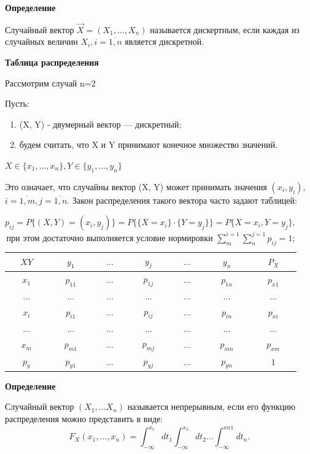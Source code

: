 \textbf{Определение}

Случайный вектор $\overrightarrow{X} = (X_1, \dots, X_n)$ называется дискертным, если каждая из случайных величин $X_i, i=\overline{1,n}$ является дискретной.


\textbf{Таблица распределения}

Рассмотрим случай n=2

Пусть: 
\begin{enumerate}[label=\arabic*.]
	\item (X, Y) - двумерный вектор --- дискретный;
	\item будем считать, что X и Y принимают конечное множество значений.  
\end{enumerate}
$X \in \{x_1, \dots, x_n\}, Y \in \{y_1, \dots, y_n\}$

Это означает, что случайны вектор (X, Y) может принимать значения $(x_i, y_i)$, $i=\overline{1,m}, j=\overline{1,n}$. Закон распределения такого вектора часто задают таблицей:
 
\begin{table}[ht!]
	\begin{center}
		\caption{$p_{ij} = P\{(X, Y)=(x_i, y_j)\} = P\{\{X=x_i\} \cdot \{Y=y_j\}\} = P\{X=x_i, Y=y_j\}, $ при этом достаточно выполняется условие нормировки $\sum_{m}^{i=1}\sum_{n}^{j=1}p_{ij}=1$;}
		\label{tbl:best}
		\begin{tabular}{|c|c|c|c|c|c|c|}
			\hline
			$XY$ & $y_1$ & $\dots$ & $y_j$ & $\dots$ &  $y_n$ & $P_X$\\  \hline
			$x_1$ & $p_{11}$ & $\dots$ & $p_{1j}$ & $\dots$ &  $p_{1n}$ & $p_{x1}$\\  \hline
			$\dots$ & $\dots$ & $\dots$ & $\dots$ & $\dots$ &  $\dots$ & $\dots$\\  \hline
			$x_i$ & $p_{i1}$ & $\dots$ & $p_{ij}$ & $\dots$ &  $p_{in}$ & $p_{xi}$\\  \hline
			$\dots$ & $\dots$ & $\dots$ & $\dots$ & $\dots$ &  $\dots$ & $\dots$\\ \hline
			$x_m$ & $p_{m1}$ & $\dots$ & $p_{mj}$ & $\dots$ &  $p_{mn}$ & $p_{xm}$\\  \hline
			$p_y$ & $p_{y1}$ & $\dots$ & $p_{yj}$ & $\dots$ &  $p_{yn}$ & $1$\\  
			\hline
		\end{tabular}
	\end{center}
\end{table}

\textbf{Определение}

Случайный вектор $(X_1, \dots X_n)$ называется непрерывным, если его функцию распределения можно представить в виде: 
\begin{equation}
	F_X(x_1, \dots, x_n) = \int_{-\infty}^{x_1}dt_1\int_{-\infty}^{x_2}dt_2 \dots
	\int_{-\infty}^{xn1}dt_n.
\end{equation}

